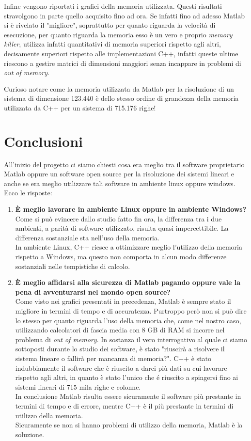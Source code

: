 \documentclass[preprint,12pt]{elsarticle}
\begin{document}
Infine vengono riportati i grafici della memoria utilizzata. Questi risultati stravolgono in parte quello acquisito fino ad ora.
Se infatti fino ad adesso Matlab si è rivelato il "migliore", soprattutto per quanto riguarda la velocità di esecuzione, per quanto riguarda la memoria esso è un vero e proprio \textit{memory killer}, utilizza infatti quantitativi di memoria superiori rispetto agli altri, decisamente superiori rispetto alle implementazioni C++, infatti queste ultime riescono a gestire matrici di dimensioni maggiori senza incappare in problemi di \textit{out of memory}.

Curioso notare come la memoria utilizzata da Matlab per la risoluzione di un sistema di dimensione 123.440 è dello stesso ordine di grandezza della memoria utilizzata da C++ per un sistema di 715.176 righe!

\section{Conclusioni}
All'inizio del progetto ci siamo chiesti cosa era meglio tra il software proprietario Matlab oppure un software open source per la risoluzione dei sistemi lineari e anche se era meglio utilizzare tali software in ambiente linux oppure windows. Ecco le risposte:

\begin{enumerate}
\item \textbf{\`E meglio lavorare in ambiente Linux oppure in ambiente Windows?}\\
Come si può evincere dallo studio fatto fin ora, la differenza tra i due ambienti, a parità di software utilizzato, risulta quasi impercettibile. La differenza sostanziale sta nell'uso della memoria.\\
In ambiente Linux, C++ riesce a ottimizzare meglio l'utilizzo della memoria rispetto a Windows, ma questo non comporta in alcun modo differenze sostanziali nelle tempistiche di calcolo.

\item \textbf{\`E meglio affidarsi alla sicurezza di Matlab pagando oppure vale la pena
di avventurarsi nel mondo open source?}\\
Come visto nei grafici presentati in precedenza, Matlab è sempre stato il migliore in termini di tempo e di accuratezza. Purtroppo però non si può dire lo stesso per quanto riguarda l'uso della memoria che, come nel nostro caso, utilizzando calcolatori di fascia media con 8 GB di RAM si incorre nel problema di \textit{out of memory}. In sostanza il vero interrogativo al quale ci siamo sottoposti durante lo studio dei software, è stato "riuscirà a risolvere il sistema lineare o fallirà per mancanza di memoria?". C++ è stato indubbiamente il software che è riuscito a darci più dati su cui lavorare rispetto agli altri, in quanto è stato l'unico che é riuscito a spingersi fino ai sistemi lineari di 715 mila righe e colonne.\\
In conclusione Matlab risulta essere sicuramente il software più prestante in termini di tempo e di errore, mentre C++ è il più prestante in termini di utilizzo della memoria.\\
Sicuramente se non si hanno problemi di utilizzo della memoria, Matlab è la soluzione.
\end{enumerate}
 
\end{document}
